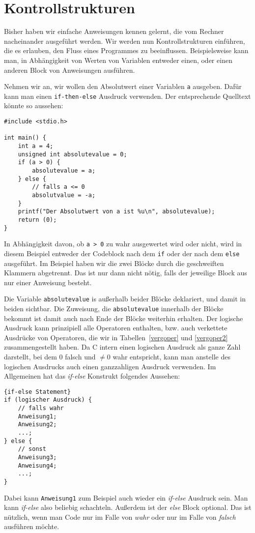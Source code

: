 \section{Kontrollstrukturen}

Bisher haben wir einfache Anweisungen kennen gelernt, die vom Rechner nacheinander ausgeführt werden.
Wir werden nun Kontrollstrukturen einführen, die es erlauben, den Fluss eines Programmes zu beeinflussen.
Beispielsweise kann man, in Abhängigkeit von Werten von Variablen entweder einen, oder einen anderen Block von Anweisungen ausführen.

Nehmen wir an, wir wollen den Absolutwert einer Variablen \verb|a| ausgeben.
Dafür kann man einen \verb|if-then-else| Ausdruck verwenden.
Der entsprechende Quelltext könnte so aussehen:
\begin{lstlisting}
#include <stdio.h>

int main() {
    int a = 4;
    unsigned int absolutevalue = 0;
    if (a > 0) {
        absolutevalue = a;
    } else {
        // falls a <= 0
        absolutvalue = -a;
    }
    printf("Der Absolutwert von a ist %u\n", absolutevalue);
    return (0);
}
\end{lstlisting}
In Abhängigkeit davon, ob \verb|a > 0| zu wahr ausgewertet wird oder nicht, wird in diesem Beispiel entweder der Codeblock nach dem \verb|if| oder der nach dem \verb|else| ausgeführt.
Im Beispiel haben wir die zwei Blöcke durch die geschweiften Klammern abgetrennt. 
Das ist nur dann nicht nötig, falls der jeweilige Block aus nur einer Anweisung besteht.

Die Variable \verb|absolutevalue| is außerhalb beider Blöcke deklariert, und damit in beiden sichtbar.
Die Zuweisung, die \verb|absolutevalue| innerhalb der Blöcke bekommt ist damit auch nach Ende der Blöcke weiterhin erhalten.
Der logische Ausdruck kann prinzipiell alle Operatoren enthalten, bzw. auch verkettete Ausdrücke von Operatoren, die wir in Tabellen~\ref{vergoper} und \ref{vergoper2} zusammengestellt haben.
Da C intern einen logischen Ausdruck als ganze Zahl darstellt, bei dem $0$ falsch und $\neq 0$ wahr entspricht, kann man anstelle des logischen Ausdrucks auch einen ganzzahligen Ausdruck verwenden.
Im Allgemeinen hat das \emph{if-else} Konstrukt folgendes Aussehen:
\begin{lstlisting}{if-else Statement}
if (logischer Ausdruck) {
    // falls wahr
    Anweisung1;
    Anweisung2;
    ...;
} else {
    // sonst
    Anweisung3;
    Anweisung4;
    ...;
}
\end{lstlisting}
Dabei kann \verb|Anweisung1| zum Beispiel auch wieder ein \emph{if-else} Ausdruck sein. 
Man kann \emph{if-else} also beliebig schachteln.
Außerdem ist der \emph{else} Block optional.
Das ist nützlich, wenn man Code nur im Falle von \emph{wahr} oder nur im Falle von \emph{falsch} ausführen möchte.

